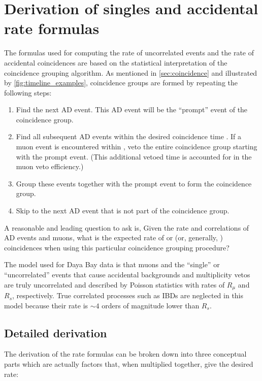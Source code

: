 \chapter{Derivation of singles and accidental rate formulas}
\label{ap:singlesformula}

The formulas used for computing the rate of uncorrelated events
and the rate of accidental coincidences
are based on the statistical interpretation
of the coincidence grouping algorithm.
As mentioned in \cref{sec:coincidence}
and illustrated by \cref{fig:timeline_examples},
coincidence groups are formed by repeating the following steps:

\begin{enumerate}
    \item Find the next AD event.
        This AD event will be the ``prompt'' event of the coincidence group.
    \item Find all subsequent AD events within the desired coincidence time \tc.
        If a muon event is encountered within \tc,
        veto the entire coincidence group starting with the prompt event.
        (This additional vetoed time is accounted for in the muon veto efficiency.)
    \item Group these events together with the prompt event
        to form the coincidence group.
    \item Skip to the next AD event that is not part of the coincidence group.
\end{enumerate}

A reasonable and leading question to ask is,
Given the rate and correlations of AD events and muons,
what is the expected rate of  or 
(or, generally, ) coincidences when using
this particular coincidence grouping procedure?

The model used for Daya Bay data is that muons
and the ``single'' or ``uncorrelated''
events that cause accidental backgrounds and
multiplicity vetos are truly uncorrelated and described by
Poisson statistics with rates of $R_\mu$ and $R_s$, respectively.
True correlated processes such as IBDs are neglected in this model
because their rate is $\sim 4$ orders of magnitude lower than $R_s$.

\section{Detailed derivation}

The derivation of the rate formulas can be broken down into three
conceptual parts which are actually factors that, when multiplied together,
give the desired rate:

